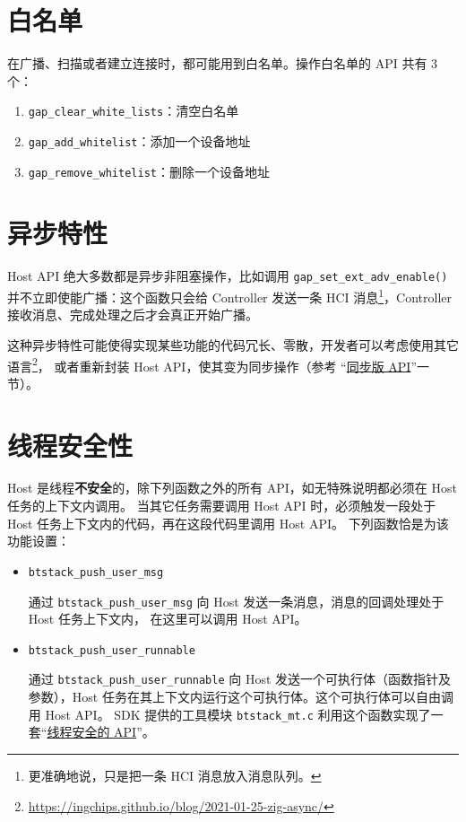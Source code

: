 \documentclass[
  12pt,
]{book}
\begin{document}
\hypertarget{ux767dux540dux5355}{%
\section{白名单}\label{ux767dux540dux5355}}

在广播、扫描或者建立连接时，都可能用到白名单。操作白名单的 API 共有 3 个：

\begin{enumerate}
\def\labelenumi{\arabic{enumi}.}
\item
  \texttt{gap\_clear\_white\_lists}：清空白名单
\item
  \texttt{gap\_add\_whitelist}：添加一个设备地址
\item
  \texttt{gap\_remove\_whitelist}：删除一个设备地址
\end{enumerate}

\hypertarget{ux5f02ux6b65ux7279ux6027}{%
\section{异步特性}\label{ux5f02ux6b65ux7279ux6027}}

Host API 绝大多数都是异步非阻塞操作，比如调用 \texttt{gap\_set\_ext\_adv\_enable()} 并不立即使能广播：这个函数只会给 Controller
发送一条 HCI 消息\footnote{更准确地说，只是把一条 HCI 消息放入消息队列。}，Controller 接收消息、完成处理之后才会真正开始广播。

这种异步特性可能使得实现某些功能的代码冗长、零散，开发者可以考虑使用其它语言\footnote{\url{https://ingchips.github.io/blog/2021-01-25-zig-async/}}，
或者重新封装 Host API，使其变为同步操作（参考 ``\protect\hyperlink{ch-misc-synced-api}{同步版 API}''一节）。

\hypertarget{ux7ebfux7a0bux5b89ux5168ux6027}{%
\section{线程安全性}\label{ux7ebfux7a0bux5b89ux5168ux6027}}

Host 是线程\textbf{不安全}的，除下列函数之外的所有 API，如无特殊说明都必须在 Host 任务的上下文内调用。
当其它任务需要调用 Host API 时，必须触发一段处于 Host 任务上下文内的代码，再在这段代码里调用 Host API。
下列函数恰是为该功能设置：

\begin{itemize}
\item
  \texttt{btstack\_push\_user\_msg}

  通过 \texttt{btstack\_push\_user\_msg} 向 Host 发送一条消息，消息的回调处理处于 Host 任务上下文内，
  在这里可以调用 Host API。
\item
  \texttt{btstack\_push\_user\_runnable}

  通过 \texttt{btstack\_push\_user\_runnable} 向 Host 发送一个可执行体（函数指针及参数），Host
  任务在其上下文内运行这个可执行体。这个可执行体可以自由调用 Host API。
  SDK 提供的工具模块 \texttt{btstack\_mt.c} 利用这个函数实现了一套``\protect\hyperlink{ch-misc-thread-safe-api}{线程安全的 API}''。
\end{itemize}
\end{document}
